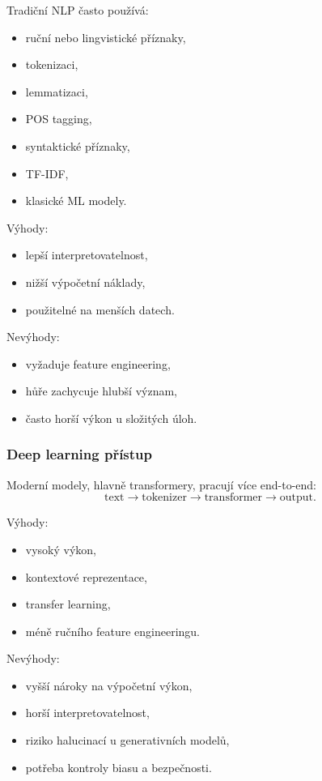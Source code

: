 Tradiční NLP často používá:
\begin{itemize}
    \item ruční nebo lingvistické příznaky,
    \item tokenizaci,
    \item lemmatizaci,
    \item POS tagging,
    \item syntaktické příznaky,
    \item TF-IDF,
    \item klasické ML modely.
\end{itemize}

Výhody:
\begin{itemize}
    \item lepší interpretovatelnost,
    \item nižší výpočetní náklady,
    \item použitelné na menších datech.
\end{itemize}

Nevýhody:
\begin{itemize}
    \item vyžaduje feature engineering,
    \item hůře zachycuje hlubší význam,
    \item často horší výkon u složitých úloh.
\end{itemize}

\subsubsection{Deep learning přístup}

Moderní modely, hlavně transformery, pracují více end-to-end:
\[
\text{text}
\rightarrow
\text{tokenizer}
\rightarrow
\text{transformer}
\rightarrow
\text{output}.
\]

Výhody:
\begin{itemize}
    \item vysoký výkon,
    \item kontextové reprezentace,
    \item transfer learning,
    \item méně ručního feature engineeringu.
\end{itemize}

Nevýhody:
\begin{itemize}
    \item vyšší nároky na výpočetní výkon,
    \item horší interpretovatelnost,
    \item riziko halucinací u generativních modelů,
    \item potřeba kontroly biasu a bezpečnosti.
\end{itemize}

